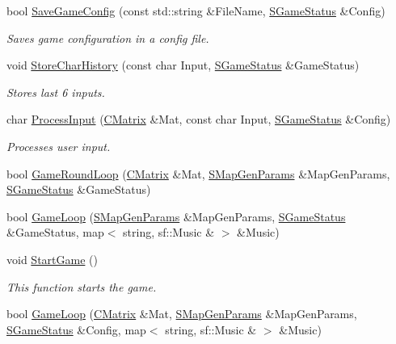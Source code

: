 \begin{DoxyCompactItemize}
bool \hyperlink{namespace_chase_game_a561c85a018e34c8baa21f7f500a3c9c7}{Save\-Game\-Config} (const std\-::string \&File\-Name, \hyperlink{struct_chase_game_1_1_s_game_status}{S\-Game\-Status} \&Config)
\begin{DoxyCompactList}\small\item\em Saves game configuration in a config file. \end{DoxyCompactList}\item 
void \hyperlink{namespace_chase_game_a4b28a3a3594d145b0ce1d1bf179e88a3}{Store\-Char\-History} (const char Input, \hyperlink{struct_chase_game_1_1_s_game_status}{S\-Game\-Status} \&Game\-Status)
\begin{DoxyCompactList}\small\item\em Stores last 6 inputs. \end{DoxyCompactList}\item 
char \hyperlink{namespace_chase_game_ab5112517855da810fe3b7bdb81d58484}{Process\-Input} (\hyperlink{namespace_chase_game_a469449f9237e59efce3982127366c550}{C\-Matrix} \&Mat, const char Input, \hyperlink{struct_chase_game_1_1_s_game_status}{S\-Game\-Status} \&Config)
\begin{DoxyCompactList}\small\item\em Processes user input. \end{DoxyCompactList}\item 
bool \hyperlink{namespace_chase_game_acb136d1f2b7073d2dc61bc2e2d65b931}{Game\-Round\-Loop} (\hyperlink{namespace_chase_game_a469449f9237e59efce3982127366c550}{C\-Matrix} \&Mat, \hyperlink{struct_chase_game_1_1_s_map_gen_params}{S\-Map\-Gen\-Params} \&Map\-Gen\-Params, \hyperlink{struct_chase_game_1_1_s_game_status}{S\-Game\-Status} \&Game\-Status)
\item 
bool \hyperlink{namespace_chase_game_a1ca6f3f9092b35d9bea0343fd032d7f0}{Game\-Loop} (\hyperlink{struct_chase_game_1_1_s_map_gen_params}{S\-Map\-Gen\-Params} \&Map\-Gen\-Params, \hyperlink{struct_chase_game_1_1_s_game_status}{S\-Game\-Status} \&Game\-Status, map$<$ string, sf\-::\-Music \& $>$ \&Music)
\item 
void \hyperlink{namespace_chase_game_a528073d13296b3cf84a6ae07c3550e74}{Start\-Game} ()
\begin{DoxyCompactList}\small\item\em This function starts the game. \end{DoxyCompactList}\item 
bool \hyperlink{namespace_chase_game_a978204f0ec269a6fa5f43bb523d84e57}{Game\-Loop} (\hyperlink{namespace_chase_game_a469449f9237e59efce3982127366c550}{C\-Matrix} \&Mat, \hyperlink{struct_chase_game_1_1_s_map_gen_params}{S\-Map\-Gen\-Params} \&Map\-Gen\-Params, \hyperlink{struct_chase_game_1_1_s_game_status}{S\-Game\-Status} \&Config, map$<$ string, sf\-::\-Music \& $>$ \&Music)

\end{DoxyCompactItemize}
